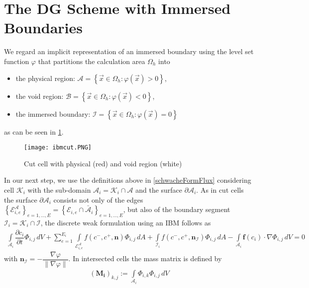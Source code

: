 	\section{The DG Scheme with Immersed Boundaries}
	We regard an implicit representation of an immersed boundary using the level set function $\varphi$ that partitions the calculation area $\Omega_h$ into 
	\begin{itemize}
		\item the physical region:  $\mathcal{A} = \left\{\vec{x} \in \Omega_h : \varphi (\vec{x}) > 0 \right\}$,
		\item the void region:  $\mathcal{B} = \left\{ \vec{x}\in \Omega_h : \varphi (\vec{x}) < 0 \right\}$, 
		\item the immersed boundary: $\mathcal{I} = \left\{ \vec{x}\in \Omega_h : \varphi (\vec{x}) = 0 \right\}$
	\end{itemize} 
	as can be seen in  \cref{fig:cutcell}.
	\begin{figure}[htp]
		\centering
		\texttt{[image: ibmcut.PNG]}
		\caption{Cut cell with physical (red) and void region (white) \cite{paper}}\label{fig:cutcell}
	\end{figure}
	In our next step, we use the definitions above in \eqref{schwacheFormFlux} considering cell $\mathcal{K}_i$ with the sub-domain $\mathcal{A}_i = \mathcal{K}_i \cap \mathcal{A}$ and the surface $\partial \mathcal{A}_i$. As in cut cells the surface $\partial \mathcal{A}_i$ consists not only of the edges $\left\{\mathcal{E}_{i,e}^\mathcal{A} \right\}_{e = 1, ..., E} = \left\{\mathcal{E}_{i,e} \cap \bar{\mathcal{A}}_i \right\}_{e = 1, ..., E}$, but also of the boundary segment $\mathcal{I}_i = \mathcal{K}_i \cap \mathcal{I}$, the discrete weak formulation using an IBM follows as
	\begin{align}
	\int\limits_{\mathcal{A}_i} \dfrac{\partial c_i}{\partial t}\Phi_{i,j} \, dV +
	\sum_{e=1}^{E_i}\int\limits_{\mathcal{E}_{i,e}^\mathcal{A}} f \left( c^-, c^+, \mathbf{n} \right) \Phi_{i,j} \, dA + \int\limits_{\mathcal{I}_{i}} f \left( c^-, c^+, \mathbf{n}_\mathcal{I} \right) \Phi_{i,j} \, dA - \int\limits_{\mathcal{A}_i} \boldsymbol{f}\left(c_i\right) \cdot \nabla\Phi_{i,j} \, dV = 0
	\label{schwacheFormIBM}
	\end{align}
	with $\mathbf{n}_\mathcal{I} = - \dfrac{\nabla\varphi}{\| \nabla\varphi \|}$.
	In intersected cells the mass matrix is defined by
	\begin{align}
		(\mathbf{M_i})_{k,j} := \int\limits_{\mathcal{A}_i}\Phi_{i,k}\Phi_{i,j}\, dV
	\end{align}
